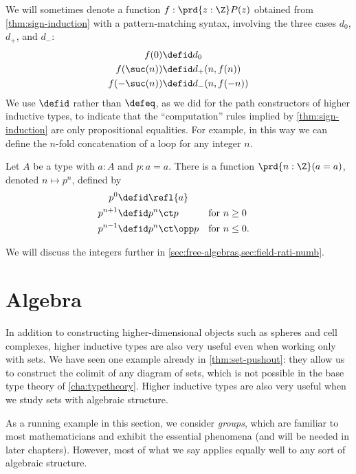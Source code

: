 We will sometimes denote a function $f:\prd{z:\Z} P(z)$ obtained from \cref{thm:sign-induction} with a pattern-matching syntax, involving the three cases $d_0$, $d_+$, and $d_-$:
\begin{align*}
  f(0) &\defid d_0\\
  f(\suc(n)) &\defid d_+(n,f(n))\\
  f(-\suc(n)) &\defid d_-(n,f(-n))
\end{align*}
We use $\defid$ rather than $\defeq$, as we did for the path constructors of higher inductive types, to indicate that the ``computation'' rules implied by \cref{thm:sign-induction} are only propositional equalities.
For example, in this way we can define the $n$-fold concatenation of a loop for any integer $n$.

\begin{cor}\label{thm:looptothe}
  Let $A$ be a type with $a:A$ and $p:a=a$.
  There is a function $\prd{n:\Z} (a=a)$, denoted $n\mapsto p^n$, defined by
  \begin{align*}
    p^0 &\defid \refl{a}\\
    p^{n+1} &\defid p^n \ct p
    & &\text{for $n\ge 0$}\\
    p^{n-1} &\defid p^n \ct \opp p
    & &\text{for $n\le 0$.}
  \end{align*}
\end{cor}

We will discuss the integers further in \cref{sec:free-algebras,sec:field-rati-numb}.

%


\section{Algebra}
\label{sec:free-algebras}

In addition to constructing higher-dimensional objects such as spheres and cell complexes, higher inductive types are also very useful even when working only with sets.
We have seen one example already in \cref{thm:set-pushout}: they allow us to construct the colimit of any diagram of sets, which is not possible in the base type theory of \cref{cha:typetheory}.
Higher inductive types are also very useful when we study sets with algebraic structure.

As a running example in this section, we consider \emph{groups}, which are familiar to most mathematicians and exhibit the essential phenomena (and will be needed in later chapters).
However, most of what we say applies equally well to any sort of algebraic structure.

